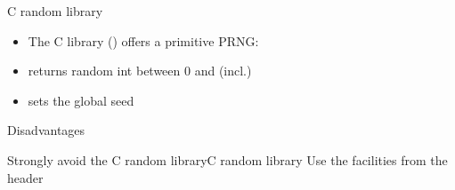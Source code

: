 \begin{frame}[fragile]
  \begin{block}{C random library}
    \begin{itemize}
      \item The C library () offers a primitive PRNG:
      \item {} returns random int between 0 and  (incl.)
      \item {} sets the global seed
    \end{itemize}
  \end{block}
  \begin{alertblock}{Disadvantages}
  \end{alertblock}
  \begin{goodpracticeWithShortcut}{Strongly avoid the C random library}{C random library}
    Use the  facilities from the  header
  \end{goodpracticeWithShortcut}
\end{frame}
